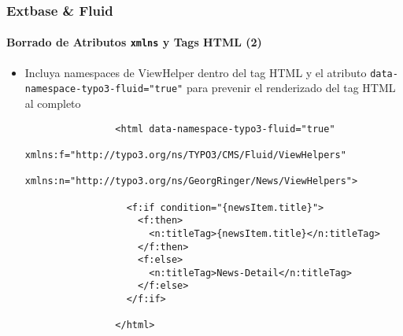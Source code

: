\begin{frame}[fragile]
	\frametitle{Extbase \& Fluid}
	\framesubtitle{Borrado de Atributos \texttt{xmlns} y Tags HTML (2)}

	\lstset{basicstyle=\tiny\ttfamily}

	\begin{itemize}

		\item Incluya namespaces de ViewHelper dentro del tag HTML y el
			atributo \texttt{data-namespace-typo3-fluid="true"} para prevenir el renderizado del tag HTML al completo

			\begin{lstlisting}
				<html data-namespace-typo3-fluid="true"
				  xmlns:f="http://typo3.org/ns/TYPO3/CMS/Fluid/ViewHelpers"
				  xmlns:n="http://typo3.org/ns/GeorgRinger/News/ViewHelpers">

				  <f:if condition="{newsItem.title}">
				    <f:then>
				      <n:titleTag>{newsItem.title}</n:titleTag>
				    </f:then>
				    <f:else>
				      <n:titleTag>News-Detail</n:titleTag>
				    </f:else>
				  </f:if>

				</html>
			\end{lstlisting}

	\end{itemize}

\end{frame}


